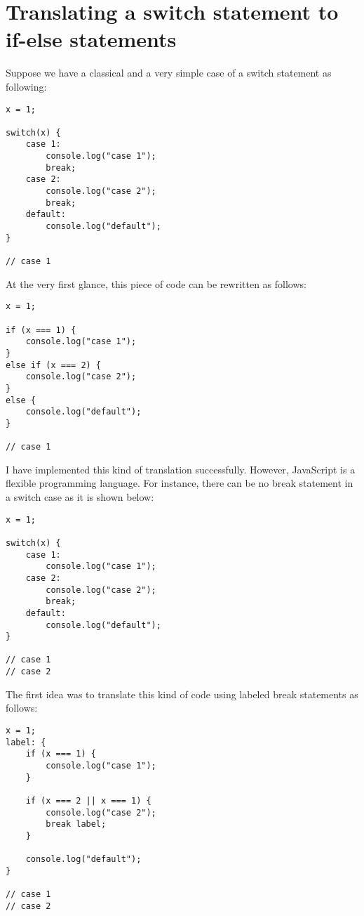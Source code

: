 \documentclass[a4paper]{article}
\begin{document}


\section*{Translating a switch statement to if-else statements}

Suppose we have a classical and a very simple case of a switch statement as following:


\begin{lstlisting}
x = 1;

switch(x) {
    case 1: 
        console.log("case 1");
        break;
    case 2:
        console.log("case 2");	
        break;
    default:
        console.log("default");
}

// case 1
\end{lstlisting}

At the very first glance, this piece of code can be rewritten as follows:

\begin{lstlisting}
x = 1;

if (x === 1) { 
    console.log("case 1");
}
else if (x === 2) {
    console.log("case 2");	
}
else {
    console.log("default");
}

// case 1
\end{lstlisting}

I have implemented this kind of translation successfully. However, JavaScript is a flexible programming language. For instance, there can be no break statement in a switch case as it is shown below:

\begin{lstlisting}
x = 1;

switch(x) {
    case 1: 
        console.log("case 1");
    case 2:
        console.log("case 2");	
        break;
    default:
        console.log("default");
}

// case 1
// case 2
\end{lstlisting}

The first idea was to translate this kind of code using labeled break statements as follows:

\begin{lstlisting}
x = 1;
label: {
    if (x === 1) { 
        console.log("case 1");
    }
	
    if (x === 2 || x === 1) {
        console.log("case 2");	
        break label;
    }
	
    console.log("default");
}

// case 1
// case 2
\end{lstlisting}
\end{document}
